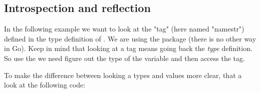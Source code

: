 \subsection{Introspection and reflection}
\label{subsec:introspection and reflection}
In the following example we want to look at the "tag" (here named
"namestr") defined in the
type definition of . We are using the
 package (there is no other way in Go). Keep in mind
that looking at a tag means going back the \emph{type} definition. So
use the  we need figure out the type of the variable
and then access the tag.


\showremarks

To make the difference between looking a types and values more clear,
that a look at the following code:
